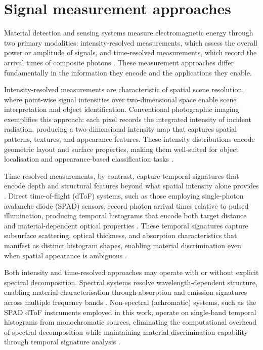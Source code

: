 \documentclass[12pt,a4paper,oneside]{report}
\let\oldsection\section
\renewcommand{\section}{\clearpage\oldsection}
\begin{document}
\section{Signal measurement approaches}
\label{sec:signal_measurement_approaches}

Material detection and sensing systems measure electromagnetic energy through two primary modalities: intensity-resolved measurements, which assess the overall power or amplitude of signals, and time-resolved measurements, which record the arrival times of composite photons \cite{su2016}. These measurement approaches differ fundamentally in the information they encode and the applications they enable.

Intensity-resolved measurements are characteristic of spatial scene resolution, where point-wise signal intensities over two-dimensional space enable scene interpretation and object identification. Conventional photographic imaging exemplifies this approach: each pixel records the integrated intensity of incident radiation, producing a two-dimensional intensity map that captures spatial patterns, textures, and appearance features. These intensity distributions encode geometric layout and surface properties, making them well-suited for object localisation and appearance-based classification tasks \cite{schwartz2013,sharan2013}.

Time-resolved measurements, by contrast, capture temporal signatures that encode depth and structural features beyond what spatial intensity alone provides \cite{su2016}. Direct time-of-flight (dToF) systems, such as those employing single-photon avalanche diode (SPAD) sensors, record photon arrival times relative to pulsed illumination, producing temporal histograms that encode both target distance and material-dependent optical properties \cite{becker2023}. These temporal signatures capture subsurface scattering, optical thickness, and absorption characteristics that manifest as distinct histogram shapes, enabling material discrimination even when spatial appearance is ambiguous \cite{su2016,becker2023}.

Both intensity and time-resolved approaches may operate with or without explicit spectral decomposition. Spectral systems resolve wavelength-dependent structure, enabling material characterisation through absorption and emission signatures across multiple frequency bands \cite{elachi2021,holt2016}. Non-spectral (achromatic) systems, such as the SPAD dToF instruments employed in this work, operate on single-band temporal histograms from monochromatic sources, eliminating the computational overhead of spectral decomposition while maintaining material discrimination capability through temporal signature analysis \cite{su2016,becker2023}.
\end{document}
